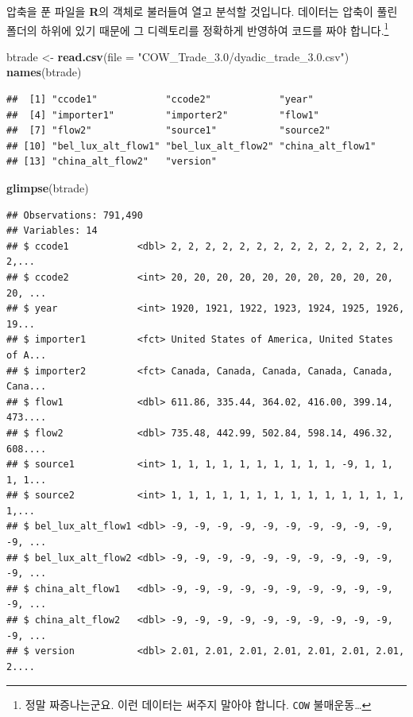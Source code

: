 \documentclass[]{book}
\newenvironment{Shaded}{\begin{snugshade}}{\end{snugshade}}
\newcommand{\DataTypeTok}[1]{\textcolor[rgb]{0.13,0.29,0.53}{#1}}
\newcommand{\KeywordTok}[1]{\textcolor[rgb]{0.13,0.29,0.53}{\textbf{#1}}}
\newcommand{\NormalTok}[1]{#1}
\newcommand{\StringTok}[1]{\textcolor[rgb]{0.31,0.60,0.02}{#1}}
\let\rmarkdownfootnote\footnote%
\def\footnote{\protect\rmarkdownfootnote}
\begin{document}
압축을 푼 파일을 \textbf{R}의 객체로 불러들여 열고 분석할 것입니다. 데이터는 압축이 풀린 폴더의 하위에 있기 때문에 그 디렉토리를 정확하게 반영하여 코드를 짜야 합니다.\footnote{정말 짜증나는군요. 이런 데이터는 써주지 말아야 합니다. \texttt{COW} 불매운동\ldots{}}

\begin{Shaded}
\begin{Highlighting}[]
\NormalTok{btrade <-}\StringTok{ }\KeywordTok{read.csv}\NormalTok{(}\DataTypeTok{file =} \StringTok{"COW_Trade_3.0/dyadic_trade_3.0.csv"}\NormalTok{)}
\KeywordTok{names}\NormalTok{(btrade)}
\end{Highlighting}
\end{Shaded}

\begin{verbatim}
##  [1] "ccode1"            "ccode2"            "year"             
##  [4] "importer1"         "importer2"         "flow1"            
##  [7] "flow2"             "source1"           "source2"          
## [10] "bel_lux_alt_flow1" "bel_lux_alt_flow2" "china_alt_flow1"  
## [13] "china_alt_flow2"   "version"
\end{verbatim}

\begin{Shaded}
\begin{Highlighting}[]
\KeywordTok{glimpse}\NormalTok{(btrade)}
\end{Highlighting}
\end{Shaded}

\begin{verbatim}
## Observations: 791,490
## Variables: 14
## $ ccode1            <dbl> 2, 2, 2, 2, 2, 2, 2, 2, 2, 2, 2, 2, 2, 2, 2,...
## $ ccode2            <int> 20, 20, 20, 20, 20, 20, 20, 20, 20, 20, 20, ...
## $ year              <int> 1920, 1921, 1922, 1923, 1924, 1925, 1926, 19...
## $ importer1         <fct> United States of America, United States of A...
## $ importer2         <fct> Canada, Canada, Canada, Canada, Canada, Cana...
## $ flow1             <dbl> 611.86, 335.44, 364.02, 416.00, 399.14, 473....
## $ flow2             <dbl> 735.48, 442.99, 502.84, 598.14, 496.32, 608....
## $ source1           <int> 1, 1, 1, 1, 1, 1, 1, 1, 1, 1, -9, 1, 1, 1, 1...
## $ source2           <int> 1, 1, 1, 1, 1, 1, 1, 1, 1, 1, 1, 1, 1, 1, 1,...
## $ bel_lux_alt_flow1 <dbl> -9, -9, -9, -9, -9, -9, -9, -9, -9, -9, -9, ...
## $ bel_lux_alt_flow2 <dbl> -9, -9, -9, -9, -9, -9, -9, -9, -9, -9, -9, ...
## $ china_alt_flow1   <dbl> -9, -9, -9, -9, -9, -9, -9, -9, -9, -9, -9, ...
## $ china_alt_flow2   <dbl> -9, -9, -9, -9, -9, -9, -9, -9, -9, -9, -9, ...
## $ version           <dbl> 2.01, 2.01, 2.01, 2.01, 2.01, 2.01, 2.01, 2....
\end{verbatim}
\end{document}

